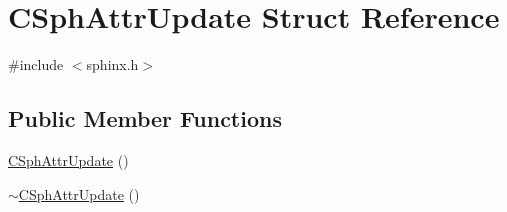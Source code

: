 \hypertarget{structCSphAttrUpdate}{\section{C\-Sph\-Attr\-Update Struct Reference}
\label{structCSphAttrUpdate}
}


{\ttfamily \#include $<$sphinx.\-h$>$}

\subsection*{Public Member Functions}
\begin{DoxyCompactItemize}
\item 
\hyperlink{structCSphAttrUpdate_a861b96a6a11792e53fc3952f4fa0ecf7}{C\-Sph\-Attr\-Update} ()
\item 
\hyperlink{structCSphAttrUpdate_addcae276a21312a28e6f5e376186ec42}{$\sim$\-C\-Sph\-Attr\-Update} ()
\end{DoxyCompactItemize}
